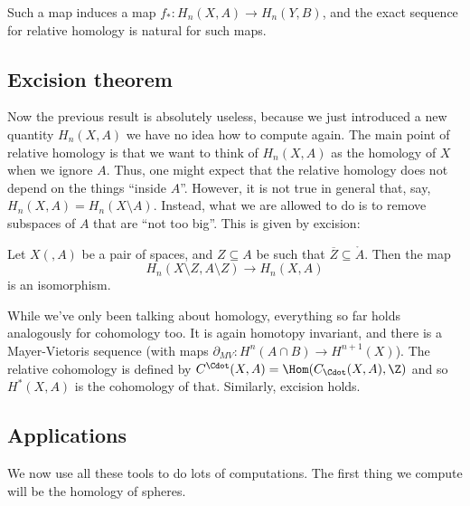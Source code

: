 \documentclass[a4paper]{article}
\begin{document}
Such a map induces a map $f_*: H_n(X, A) \to H_n(Y, B)$, and the exact sequence for relative homology is natural for such maps.

\subsection{Excision theorem}
Now the previous result is absolutely useless, because we just introduced a new quantity $H_n(X, A)$ we have no idea how to compute again. The main point of relative homology is that we want to think of $H_n(X, A)$ as the homology of $X$ when we ignore $A$. Thus, one might expect that the relative homology does not depend on the things ``inside $A$''. However, it is not true in general that, say, $H_n(X, A) = H_n(X \setminus A)$. Instead, what we are allowed to do is to remove subspaces of $A$ that are ``not too big''. This is given by excision:

\begin{thm}
  Let $X(, A)$ be a pair of spaces, and $Z \subseteq A$ be such that $\overline{Z} \subseteq \mathring{A}$. Then the map
  \[
    H_n(X \setminus Z, A \setminus Z) \to H_n(X, A)
  \]
  is an isomorphism.
\end{thm}
\begin{center}
\end{center}
While we've only been talking about homology, everything so far holds analogously for cohomology too. It is again homotopy invariant, and there is a Mayer-Vietoris sequence (with maps $\partial_{MV}: H^n(A \cap B) \to H^{n + 1}(X)$). The relative cohomology is defined by $C^{\Cdot}(X, A) = \Hom(C_{\Cdot}(X, A), \Z)$ and so $H^*(X, A)$ is the cohomology of that. Similarly, excision holds.

\subsection{Applications}
We now use all these tools to do lots of computations. The first thing we compute will be the homology of spheres.
\end{document}
